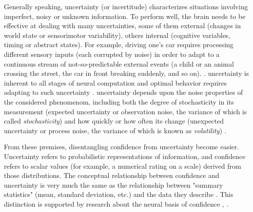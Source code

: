 Generally speaking, \gls{uncertainty} (or incertitude) characterizes situations involving imperfect, noisy or unknown information. To perform well, the brain needs to be effective at dealing with many uncertainties, some of them external (changes in world state or sensorimotor variability), others internal (cognitive variables, timing or abstract states). For example, driving one's car requires processing different sensory inputs (each corrupted by noise) in order to adapt to a continuous stream of not-so-predictable external events (a child or an animal crossing the street, the car in front breaking suddenly, and so on). \cite{pougetConfidenceCertaintyDistinct2016}. \Gls{uncertainty} is inherent to all stages of neural computation and optimal behavior requires adapting to such uncertainty \cite{flemingMetacognitionConfidenceReview}. \Gls{uncertainty} depends upon the noise properties of the considered phenomenom, including both the degree of stochasticity in its measurement (expected uncertainty or observation noise, the variance of which is called \textit{stochasticity}) and how quickly or how often its change (unexpected uncertainty or process noise, the variance of which is known as \textit{volatility}) \cite{pirayModelLearningBased2021}.

From these premises, disentangling confidence from uncertainty become easier. Uncertainty refers to probabilistic representations of information, and confidence refers to scalar values (for example, a numerical rating on a scale) derived from those distributions. The conceptual relationship between confidence and uncertainty is very much the same as the relationship between "summary statistics" (mean, standard deviation, etc.) and the data they describe \cite{meynielConfidenceBayesianProbability2015}. This distinction is supported by research about the neural basis of confidence \cite{pougetConfidenceCertaintyDistinct2016}, \cite{flemingMetacognitionConfidenceReview}.
